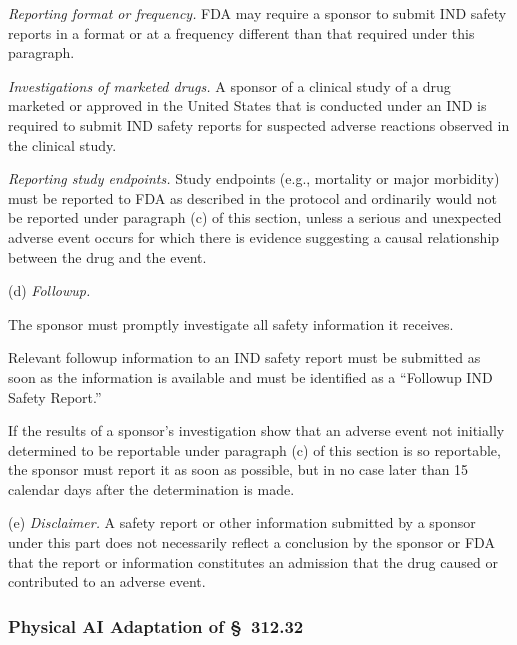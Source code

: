 \documentclass[11pt]{article}
\begin{document}
\begin{description}[leftmargin=0.5cm,style=sameline]
\item[(3)] \textit{Reporting format or frequency.} FDA may require a sponsor to submit IND safety reports in a format or at a frequency different than that required under this paragraph.

\item[(4)] \textit{Investigations of marketed drugs.} A sponsor of a clinical study of a drug marketed or approved in the United States that is conducted under an IND is required to submit IND safety reports for suspected adverse reactions observed in the clinical study.

\item[(5)] \textit{Reporting study endpoints.} Study endpoints (e.g., mortality or major morbidity) must be reported to FDA as described in the protocol and ordinarily would not be reported under paragraph (c) of this section, unless a serious and unexpected adverse event occurs for which there is evidence suggesting a causal relationship between the drug and the event.
\end{description}

(d) \textit{Followup.}

\begin{description}[leftmargin=0.5cm,style=sameline]
\item[(1)] The sponsor must promptly investigate all safety information it receives.
\item[(2)] Relevant followup information to an IND safety report must be submitted as soon as the information is available and must be identified as a ``Followup IND Safety Report.''
\item[(3)] If the results of a sponsor's investigation show that an adverse event not initially determined to be reportable under paragraph (c) of this section is so reportable, the sponsor must report it as soon as possible, but in no case later than 15 calendar days after the determination is made.
\end{description}

(e) \textit{Disclaimer.} A safety report or other information submitted by a sponsor under this part does not necessarily reflect a conclusion by the sponsor or FDA that the report or information constitutes an admission that the drug caused or contributed to an adverse event.

\subsubsection{Physical AI Adaptation of \S~312.32}
\end{document}
